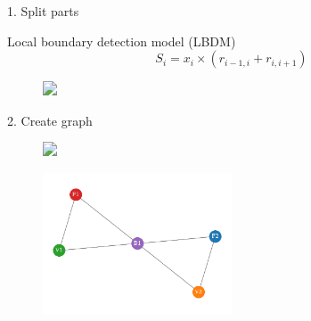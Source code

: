 \documentclass[handout]{beamer}
\begin{document}
\begin{frame}{1. Split parts}
    \begin{block}{}
        \centering
        Local boundary detection model (LBDM)
        \begin{equation*}
            S_i=x_i\times (r_{i-1, i} + r_{i, i+1})
        \end{equation*}
    \end{block}
    \begin{figure}
        \centering
        \includegraphics<1->[width=0.8\textwidth]{../Figures/toy-1.png}
    \end{figure}
\end{frame}

\begin{frame}{2. Create graph}

    \begin{figure}
        \centering
        \includegraphics<1->[width=0.8\textwidth]{../Figures/toy-1.png}
    \end{figure}
    \begin{figure}
        \centering
        \includegraphics[width=0.5\textwidth]{../Figures/toy_graph.pdf}
    \end{figure}
\end{frame}
\end{document}
